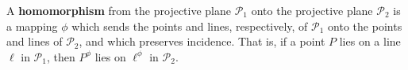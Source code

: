A \textbf{homomorphism} from the projective plane $\mathcal{P}_1$ onto the projective plane $\mathcal{P}_2$ is a mapping $\phi$ which sends the points and lines, respectively, of $\mathcal{P}_1$ onto the points and lines of $\mathcal{P}_2$, and which preserves incidence. That is, if a point $P$ lies on a line $\ell$ in $\mathcal{P}_1$, then $P^\phi$ lies on $\ell^\phi$ in $\mathcal{P}_2$.
